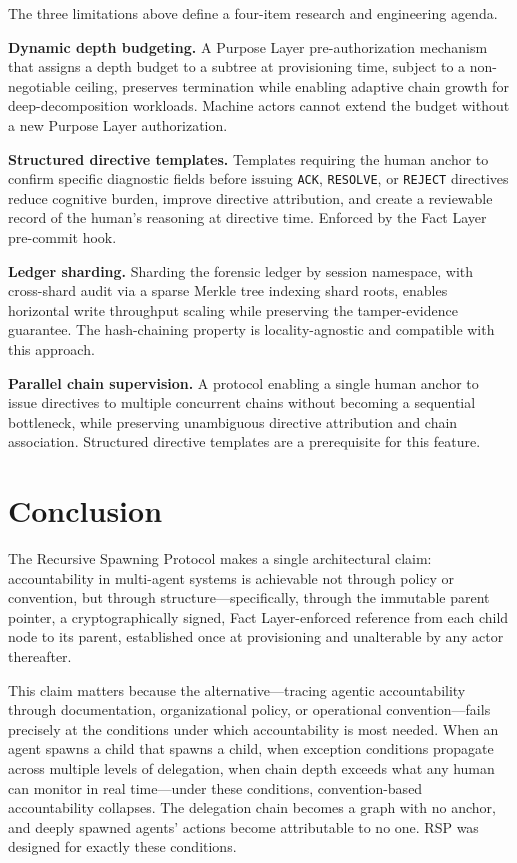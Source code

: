 The three limitations above define a four-item research and engineering agenda.

\textbf{Dynamic depth budgeting.} A Purpose Layer pre-authorization mechanism that assigns a depth budget to a subtree at provisioning time, subject to a non-negotiable ceiling, preserves termination while enabling adaptive chain growth for deep-decomposition workloads. Machine actors cannot extend the budget without a new Purpose Layer authorization.

\textbf{Structured directive templates.} Templates requiring the human anchor to confirm specific diagnostic fields before issuing \texttt{ACK}, \texttt{RESOLVE}, or \texttt{REJECT} directives reduce cognitive burden, improve directive attribution, and create a reviewable record of the human's reasoning at directive time. Enforced by the Fact Layer pre-commit hook.

\textbf{Ledger sharding.} Sharding the forensic ledger by session namespace, with cross-shard audit via a sparse Merkle tree indexing shard roots, enables horizontal write throughput scaling while preserving the tamper-evidence guarantee. The hash-chaining property is locality-agnostic and compatible with this approach.

\textbf{Parallel chain supervision.} A protocol enabling a single human anchor to issue directives to multiple concurrent chains without becoming a sequential bottleneck, while preserving unambiguous directive attribution and chain association. Structured directive templates are a prerequisite for this feature.

\section{Conclusion}
\label{sec:rs-conclusion}

The Recursive Spawning Protocol makes a single architectural claim: accountability in multi-agent systems is achievable not through policy or convention, but through structure---specifically, through the immutable parent pointer, a cryptographically signed, Fact Layer-enforced reference from each child node to its parent, established once at provisioning and unalterable by any actor thereafter.

This claim matters because the alternative---tracing agentic accountability through documentation, organizational policy, or operational convention---fails precisely at the conditions under which accountability is most needed. When an agent spawns a child that spawns a child, when exception conditions propagate across multiple levels of delegation, when chain depth exceeds what any human can monitor in real time---under these conditions, convention-based accountability collapses. The delegation chain becomes a graph with no anchor, and deeply spawned agents' actions become attributable to no one. RSP was designed for exactly these conditions.

